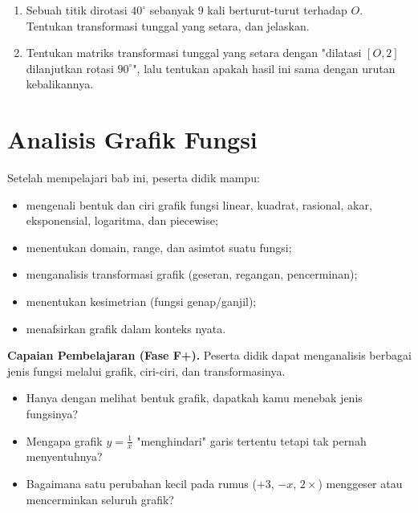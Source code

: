 \documentclass[11pt,a4paper]{report}
\theoremstyle{gaya}
\begin{document}
\begin{challenge}
\begin{enumerate}[leftmargin=*,topsep=2pt]
  \item Sebuah titik dirotasi $40^\circ$ sebanyak $9$ kali berturut-turut terhadap $O$. Tentukan transformasi tunggal yang setara, dan jelaskan.
  \item Tentukan matriks transformasi tunggal yang setara dengan "dilatasi $[O,2]$ dilanjutkan rotasi $90^\circ$", lalu tentukan apakah hasil ini sama dengan urutan kebalikannya.
\end{enumerate}
\end{challenge}

\chapter{Analisis Grafik Fungsi}
\begin{tujuan}
Setelah mempelajari bab ini, peserta didik mampu:
\begin{itemize}[leftmargin=*,topsep=2pt]
  \item mengenali bentuk dan ciri grafik fungsi linear, kuadrat, rasional, akar, eksponensial, logaritma, dan piecewise;
  \item menentukan domain, range, dan asimtot suatu fungsi;
  \item menganalisis transformasi grafik (geseran, regangan, pencerminan);
  \item menentukan kesimetrian (fungsi genap/ganjil);
  \item menafsirkan grafik dalam konteks nyata.
\end{itemize}
\textbf{Capaian Pembelajaran (Fase F+).} Peserta didik dapat menganalisis berbagai jenis fungsi melalui grafik, ciri-ciri, dan transformasinya.
\end{tujuan}

\begin{pemantik}
\begin{itemize}[leftmargin=*,topsep=2pt]
  \item Hanya dengan melihat bentuk grafik, dapatkah kamu menebak jenis fungsinya?
  \item Mengapa grafik $y=\tfrac1x$ "menghindari" garis tertentu tetapi tak pernah menyentuhnya?
  \item Bagaimana satu perubahan kecil pada rumus ($+3$, $-x$, $2\times$) menggeser atau mencerminkan seluruh grafik?
\end{itemize}
\end{pemantik}
\end{document}
